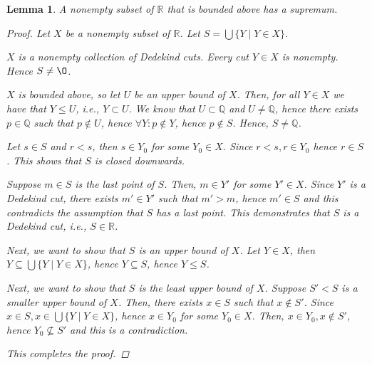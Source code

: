 \documentclass[11pt]{article}
\newcommand{\bbQ}{\mathbb{Q}}
\newcommand{\bbR}{\mathbb{R}}
\renewcommand{\emptyset}{\O}
\newtheorem{lemma}[theorem]{Lemma}
\theoremstyle{definition}
\numberwithin{equation}{subsection}
\begin{document}
\begin{lemma}
	A nonempty subset of $\bbR$ that is bounded above has a supremum.

\begin{proof}
Let $X$ be a nonempty subset of $\bbR$. Let $S = \bigcup \{Y \mid Y \in X\}$.

$X$ is a nonempty collection of Dedekind cuts. Every cut $Y \in X$ is nonempty. Hence $S \neq \emptyset$.

$X$ is bounded above, so let $U$ be an upper bound of $X$. Then, for all $Y \in X$ we have that $Y \leq U$, i.e., $Y \subset U$. We know that $U \subset \bbQ$ and $U \neq \bbQ$, hence there exists $p \in \bbQ$ such that $p \notin U$, hence $\forall Y: p \notin Y$, hence $p \notin S$. Hence, $S \neq \bbQ$. 

Let $s \in S$ and $r<s$, then $s \in Y_0$ for some $Y_0 \in X$. Since $r<s, r \in Y_0$ hence $r \in S$. This shows that $S$ is closed downwards.

Suppose $m \in S$ is the last point of $S$. Then, $m \in Y'$ for some $Y' \in X$. Since $Y'$ is a Dedekind cut, there exists $m' \in Y'$ such that $m'>m$, hence $m' \in S$ and this contradicts the assumption that $S$ has a last point. This demonstrates that $S$ is a Dedekind cut, i.e., $S \in \bbR$.

Next, we want to show that $S$ is an upper bound of $X$. Let $Y \in X$, then $Y \subseteq \bigcup\{Y \mid Y \in X\}$, hence $Y \subseteq S$, hence $Y \leq S$.

Next, we want to show that $S$ is the least upper bound of $X$. Suppose $S'<S$ is a smaller upper bound of $X$. Then, there exists $x \in S$ such that $x \notin S'$. Since $x \in S, x \in \bigcup\{Y \mid Y \in X\}$, hence $x \in Y_0$ for some $Y_0 \in X$. Then, $x \in Y_0, x \notin S'$, hence $Y_0 \not \subseteq S'$ and this is a contradiction.

This completes the proof.

\renewcommand\qedsymbol{QED}
\end{proof}
\end{lemma}
\end{document}
